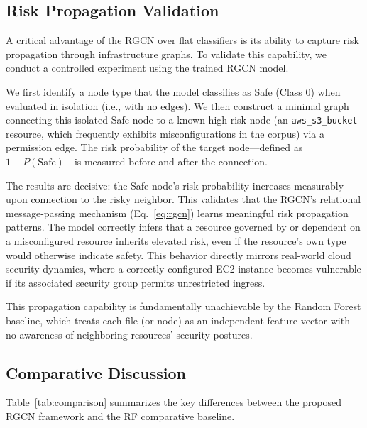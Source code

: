 \documentclass[conference]{IEEEtran}
\begin{document}
\subsection{Risk Propagation Validation}

A critical advantage of the RGCN over flat classifiers is its ability to capture risk propagation through infrastructure graphs. To validate this capability, we conduct a controlled experiment using the trained RGCN model.

We first identify a node type that the model classifies as Safe (Class 0) when evaluated in isolation (i.e., with no edges). We then construct a minimal graph connecting this isolated Safe node to a known high-risk node (an \texttt{aws\_s3\_bucket} resource, which frequently exhibits misconfigurations in the corpus) via a permission edge. The risk probability of the target node---defined as $1 - P(\text{Safe})$---is measured before and after the connection.

The results are decisive: the Safe node's risk probability increases measurably upon connection to the risky neighbor. This validates that the RGCN's relational message-passing mechanism (Eq.~\ref{eq:rgcn}) learns meaningful risk propagation patterns. The model correctly infers that a resource governed by or dependent on a misconfigured resource inherits elevated risk, even if the resource's own type would otherwise indicate safety. This behavior directly mirrors real-world cloud security dynamics, where a correctly configured EC2 instance becomes vulnerable if its associated security group permits unrestricted ingress.

This propagation capability is fundamentally unachievable by the Random Forest baseline, which treats each file (or node) as an independent feature vector with no awareness of neighboring resources' security postures.

\subsection{Comparative Discussion}

Table~\ref{tab:comparison} summarizes the key differences between the proposed RGCN framework and the RF comparative baseline.
\end{document}
